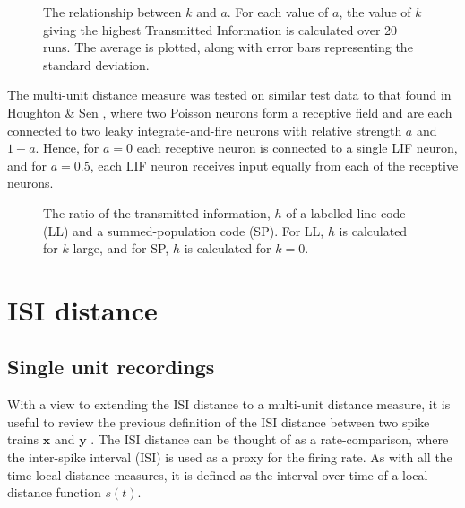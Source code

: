 \documentclass[12pt]{amsart}
\begin{document}
 \begin{figure}[thb]

\caption{The relationship between $k$ and $a$.  For each value of $a$, the value of $k$ giving the highest Transmitted Information is calculated over 20 runs.  The average is plotted, along with error bars representing the standard deviation.\label{fig:bestk}}
\end{figure}

 The multi-unit distance measure was tested on similar test data to that found in Houghton \& Sen \cite{HoughtonSen2008}, where two Poisson neurons form a receptive field and are each connected to two leaky integrate-and-fire neurons with relative strength $a$ and $1-a$.  Hence, for $a=0$ each receptive neuron is connected to a single LIF neuron, and for $a=0.5$, each LIF neuron receives input equally from each of the receptive neurons.  

\begin{figure}[htb]

\caption{The ratio of the transmitted information, $h$ of a labelled-line code (LL) and a summed-population code (SP).  For LL, $h$ is calculated for $k$ large, and for SP, $h$ is calculated for $k=0$. \label{fig:ratio}}
\end{figure}
\newpage
\section{ISI distance}
\bigskip
\subsection{Single unit recordings}

With a view to extending the ISI distance to a multi-unit distance measure, it is useful to review the previous definition of the ISI distance between two spike trains $\mathbf{x}$ and $\mathbf{y}$ .  The ISI distance can be thought of as a rate-comparison, where the inter-spike interval (ISI) is used as a proxy for the firing rate.  As with all the time-local distance measures, it is defined as the interval over time of a local distance function $s(t)$.
\end{document}
